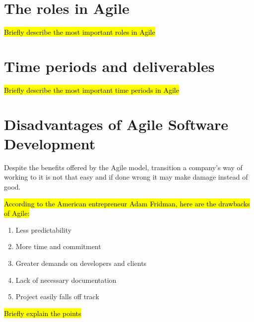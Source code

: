 



\section{The roles in Agile}
\hl{Briefly describe the most important roles in Agile}

\section{Time periods and deliverables}
\hl{Briefly describe the most important time periods in Agile}


\section{Disadvantages of Agile Software Development}
	
	Despite the benefits offered by the Agile model, transition a company's way of working to it is not that easy and if done wrong it may make damage instead of good.

	\hl{According to the American entrepreneur Adam Fridman, here are the drawbacks of Agile:}
	\begin{enumerate}
		\item Less predictability
		\item More time and commitment
		\item Greater demands on developers and clients
		\item Lack of necessary documentation
		\item Project easily falls off track
	\end{enumerate}
	\hl{Briefly explain the points}
	
